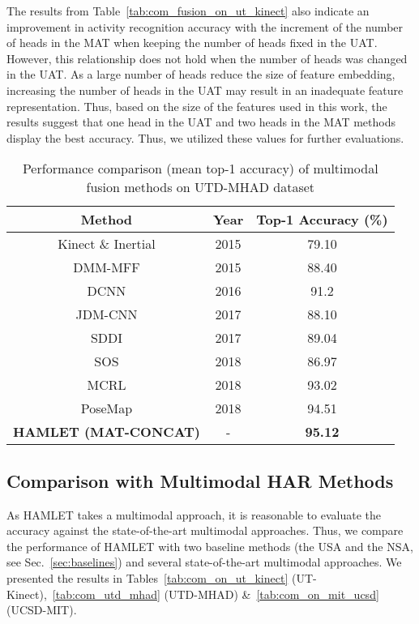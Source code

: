 \documentclass[runningheads]{llncs}
\newcommand{\pa}{HAMLET}
\begin{document}
\par The results from Table~\ref{tab:com_fusion_on_ut_kinect} also indicate an improvement in activity recognition accuracy with the increment of the number of heads in the MAT when keeping the number of heads fixed in the UAT. However, this relationship does not hold when the number of heads was changed in the UAT. As a large number of heads reduce the size of feature embedding, increasing the number of heads in the UAT may result in an inadequate feature representation. Thus, based on the size of the features used in this work, the results suggest that one head in the UAT and two heads in the MAT methods display the best accuracy. Thus, we utilized these values for further evaluations. 

\begin{table}[!t]
\centering
\caption{Performance comparison (mean top-1 accuracy) of multimodal fusion methods on UTD-MHAD dataset \cite{utd_mhad}}
    \label{tab:com_utd_mhad}
\begin{tabular}{ccc}
\toprule
    Method & Year & Top-1 Accuracy (\%) \\ \hline
    Kinect \& Inertial \cite{utd_mhad} & 2015 & 79.10 \\
    DMM-MFF \cite{dmm_mff} & 2015 & 88.40 \\
    DCNN \cite{dcnn} & 2016 & 91.2\\
    JDM-CNN \cite{jdm_cnn} & 2017 & 88.10 \\
    SDDI \cite{sdd_iccv} & 2017 & 89.04 \\
    SOS \cite{sos} & 2018 & 86.97 \\
    MCRL \cite{mcrl} & 2018 & 93.02 \\
    PoseMap \cite{posemap} & 2018 & 94.51 \\ 
    \textbf{\pa{ }(MAT-CONCAT)} & - & \textbf{95.12} \\
\bottomrule
\end{tabular}
\label{tab:accuracy33}
    \vspace{-0.2in}
\end{table}


\subsection{Comparison with Multimodal HAR Methods}\label{sec:com_multimodal_har}
As {\pa } takes a multimodal approach, it is reasonable to evaluate the accuracy against the state-of-the-art multimodal approaches. Thus, we compare the performance of {\pa } with two baseline methods (the USA and the NSA, see Sec.~\ref{sec:baselines}) and several state-of-the-art multimodal approaches. We presented the results in Tables~\ref{tab:com_on_ut_kinect} (UT-Kinect),~\ref{tab:com_utd_mhad} (UTD-MHAD) \&~\ref{tab:com_on_mit_ucsd} (UCSD-MIT).
\end{document}
